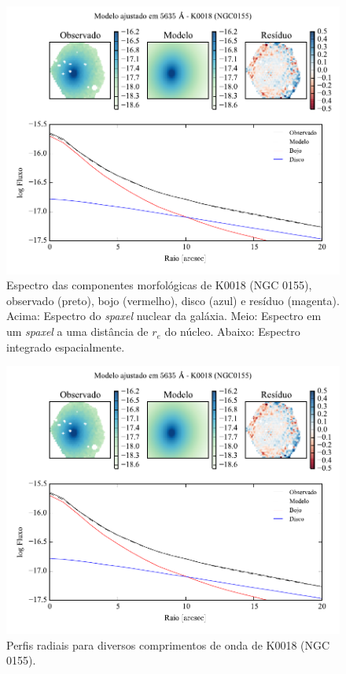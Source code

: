 \begin{figure}
	\includegraphics[page=4]{figuras-decomp/K0018_sample006a}
	\caption[Espectro das componentes morfológicas de K0018 (NGC 0155)]
	{Espectro das componentes morfológicas de K0018 (NGC 0155),
	observado (preto), bojo (vermelho), disco (azul) e resíduo (magenta). Acima:
	Espectro do {\em spaxel} nuclear da galáxia. Meio: Espectro em um {\em spaxel}
	a uma distância de $r_e$ do núcleo. Abaixo: Espectro integrado espacialmente.}
	\label{fig:decompSpectra:K0018}
\end{figure}

\begin{figure}
	\includegraphics[page=5]{figuras-decomp/K0018_sample006a}
	\caption[Perfis radiais para diversos comprimentos de onda de K0018 (NGC 0155)]
	{Perfis radiais para diversos comprimentos de onda de K0018 (NGC 0155).}
	\label{fig:decompRadprofSpec:K0018}
\end{figure}

